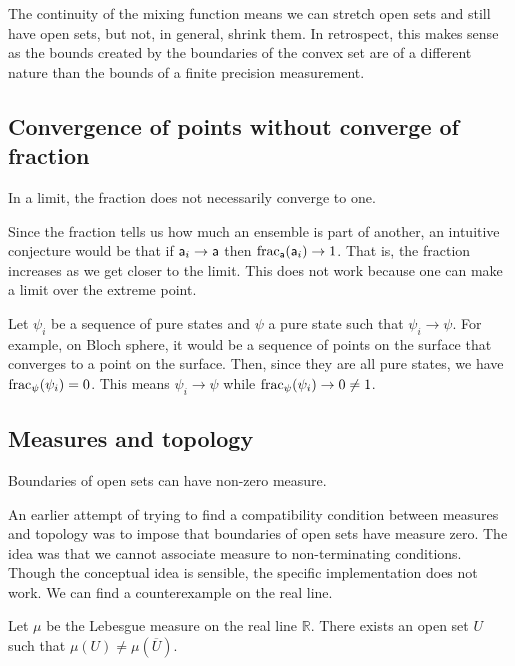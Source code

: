 The continuity of the mixing function means we can stretch open sets and still have open sets, but not, in general, shrink them. In retrospect, this makes sense as the bounds created by the boundaries of the convex set are of a different nature than the bounds of a finite precision measurement.

\subsection{Convergence of points without converge of fraction}

\begin{insight}
	In a limit, the fraction does not necessarily converge to one.
\end{insight}

Since the fraction tells us how much an ensemble is part of another, an intuitive conjecture would be that if $\ens[a]_i \to \ens[a]$ then $\fraction_{\ens[a]}(\ens[a]_i) \to 1$. That is, the fraction increases as we get closer to the limit. This does not work because one can make a limit over the extreme point.

\begin{example}
	Let $\psi_i$ be a sequence of pure states and $\psi$ a pure state such that $\psi_i \to \psi$. For example, on Bloch sphere, it would be a sequence of points on the surface that converges to a point on the surface. Then, since they are all pure states, we have $\fraction_{\psi}(\psi_i) = 0$. This means $\psi_i \to \psi$ while $\fraction_{\psi}(\psi_i) \to 0 \neq 1$.
\end{example}

\subsection{Measures and topology}

\begin{insight}
	Boundaries of open sets can have non-zero measure.
\end{insight}

An earlier attempt of trying to find a compatibility condition between measures and topology was to impose that boundaries of open sets have measure zero. The idea was that we cannot associate measure to non-terminating conditions. Though the conceptual idea is sensible, the specific implementation does not work. We can find a counterexample on the real line. 

\begin{prop}
	Let $\mu$ be the Lebesgue measure on the real line $\mathbb{R}$. There exists an open set $U$ such that $\mu(U) \neq \mu(\overline{U})$.
\end{prop}

